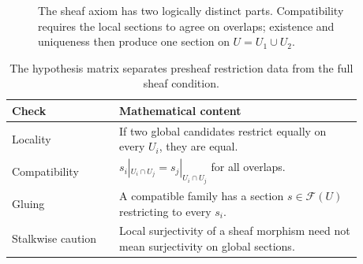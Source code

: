 \begin{figure}[htbp]
\centering
{}
\caption{The sheaf axiom has two logically distinct parts. Compatibility requires the
local sections to agree on overlaps; existence and uniqueness then produce one section
on $U=U_1\cup U_2$.}
\label{fig:vi13-c07-sheaf-gluing}
\end{figure}

\begin{table}[htbp]
\centering\small
\begin{tabular}{p{0.27\linewidth}p{0.61\linewidth}}
\toprule
Check & Mathematical content\\
\midrule
Locality & If two global candidates restrict equally on every $U_i$, they are equal.\\
Compatibility & $s_i|_{U_i\cap U_j}=s_j|_{U_i\cap U_j}$ for all overlaps.\\
Gluing & A compatible family has a section $s\in\mathcal F(U)$ restricting to every $s_i$.\\
Stalkwise caution & Local surjectivity of a sheaf morphism need not mean surjectivity on global sections.\\
\bottomrule
\end{tabular}
\caption{The hypothesis matrix separates presheaf restriction data from the full sheaf condition.}
\label{tab:vi13-c07-sheaf-hypotheses}
\end{table}
